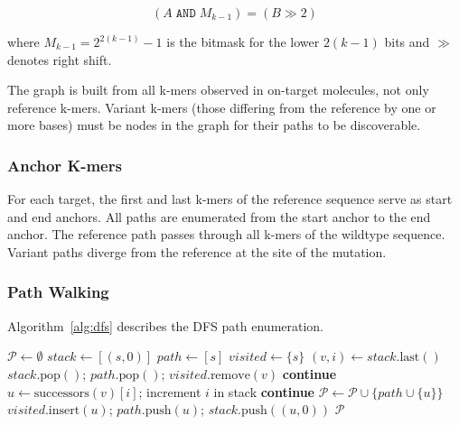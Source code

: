 \begin{equation}
  \label{eq:edge-2bit}
  (A \;\texttt{AND}\; M_{k-1}) = (B \gg 2)
\end{equation}

\noindent where $M_{k-1} = 2^{2(k-1)} - 1$ is the bitmask for the lower $2(k{-}1)$ bits and $\gg$ denotes right shift.

The graph is built from all k-mers observed in on-target molecules, not only reference k-mers.
Variant k-mers (those differing from the reference by one or more bases) must be nodes in the graph for their paths to be discoverable.

\subsubsection{Anchor K-mers}

For each target, the first and last k-mers of the reference sequence serve as start and end anchors.
All paths are enumerated from the start anchor to the end anchor.
The reference path passes through all k-mers of the wildtype sequence.
Variant paths diverge from the reference at the site of the mutation.

\subsubsection{Path Walking}

Algorithm~\ref{alg:dfs} describes the DFS path enumeration.

\begin{algorithm}
\caption{Iterative DFS path enumeration between anchor k-mers.}
\label{alg:dfs}
\begin{algorithmic}[1]
\State $\mathcal{P} \gets \emptyset$
\State $\mathit{stack} \gets [(s, 0)]$ 
\State $\mathit{path} \gets [s]$
\State $\mathit{visited} \gets \{s\}$
  \State $(v, i) \gets \mathit{stack}.\text{last}()$
   
    \State $\mathit{stack}.\text{pop}()$; $\mathit{path}.\text{pop}()$; $\mathit{visited}.\text{remove}(v)$
    \State \textbf{continue}
  \EndIf
  \State $u \gets \text{successors}(v)[i]$; increment $i$ in stack
    \State \textbf{continue} 
  \EndIf
    \State $\mathcal{P} \gets \mathcal{P} \cup \{\mathit{path} \cup \{u\}\}$
  \Else
    \State $\mathit{visited}.\text{insert}(u)$; $\mathit{path}.\text{push}(u)$; $\mathit{stack}.\text{push}((u, 0))$
  \EndIf
\EndWhile
\State \Return $\mathcal{P}$
\end{algorithmic}
\end{algorithm}

